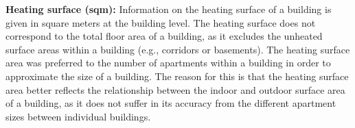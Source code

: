 \documentclass[12pt,twoside]{reedthesis}
\begin{document}
\textbf{Heating surface (sqm):} Information on the heating surface of a building is given in square meters at the building level. The heating surface does not correspond to the total floor area of a building, as it excludes the unheated surface areas within a building (e.g., corridors or basements). The heating surface area was preferred to the number of apartments within a building in order to approximate the size of a building. The reason for this is that the heating surface area better reflects the relationship between the indoor and outdoor surface area of a building, as it does not suffer in its accuracy from the different apartment sizes between individual buildings.
\begin{table}[]
\centering
\caption{Variables and data sources}
\label{tab:variables}
\end{table}
\end{document}
